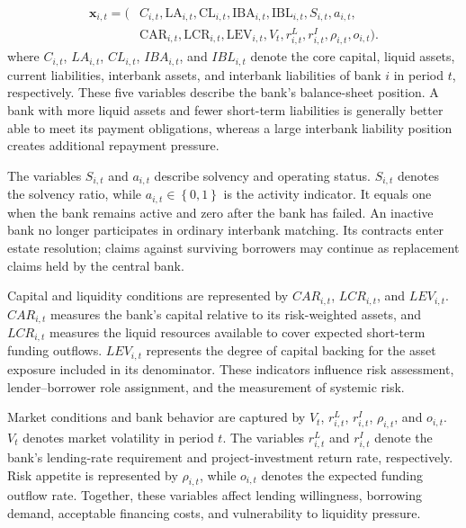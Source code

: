 \begin{equation}
\begin{aligned}
\mathbf x_{i,t}=(&C_{i,t},\mathrm{LA}_{i,t},\mathrm{CL}_{i,t},\mathrm{IBA}_{i,t},\mathrm{IBL}_{i,t},S_{i,t},a_{i,t},\\
&\mathrm{CAR}_{i,t},\mathrm{LCR}_{i,t},\mathrm{LEV}_{i,t},V_t,r_{i,t}^{L},r_{i,t}^{I},\rho_{i,t},o_{i,t}).
\end{aligned}
\label{eq:node-state}
\end{equation}
\vspace{-0.4\baselineskip}
\noindent where \(C_{i,t}\), \(LA_{i,t}\), \(CL_{i,t}\), \(IBA_{i,t}\), and
\(IBL_{i,t}\) denote the core capital, liquid assets, current
liabilities, interbank assets, and interbank liabilities of bank \(i\) in
period \(t\), respectively. These five variables describe the bank's
balance-sheet position. A bank with more liquid assets and fewer
short-term liabilities is generally better able to meet its payment
obligations, whereas a large interbank liability position creates
additional repayment pressure.

The variables \(S_{i,t}\) and \(a_{i,t}\) describe solvency and operating
status. \(S_{i,t}\) denotes the solvency ratio, while
\(a_{i,t} \in \left\{ 0,1 \right\}\) is the activity indicator. It equals
one when the bank remains active and zero after the bank has failed. An
inactive bank no longer participates in ordinary interbank matching.
Its contracts enter estate resolution; claims against surviving borrowers
may continue as replacement claims held by the central bank.

Capital and liquidity conditions are represented by \(CAR_{i,t}\),
\(LCR_{i,t}\), and \(LEV_{i,t}\). \(CAR_{i,t}\) measures the bank's
capital relative to its risk-weighted assets, and \(LCR_{i,t}\) measures
the liquid resources available to cover expected short-term funding
outflows. \(LEV_{i,t}\) represents the degree of capital backing for the
asset exposure included in its denominator. These indicators influence
risk assessment, lender--borrower role assignment, and the measurement
of systemic risk.

Market conditions and bank behavior are captured by \(V_{t}\),
\(r_{i,t}^{L}\), \(r_{i,t}^{I}\), \(\rho_{i,t}\), and \(o_{i,t}\).
\(V_{t}\) denotes market volatility in period \(t\). The variables
\(r_{i,t}^{L}\) and \(r_{i,t}^{I}\) denote the bank's lending-rate
requirement and project-investment return rate, respectively. Risk
appetite is represented by \(\rho_{i,t}\), while \(o_{i,t}\) denotes the
expected funding outflow rate. Together, these variables affect lending
willingness, borrowing demand, acceptable financing costs, and
vulnerability to liquidity pressure.

